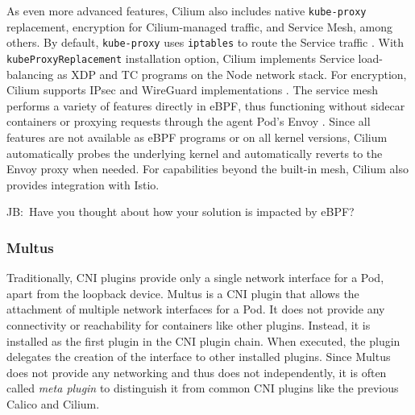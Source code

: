 \documentclass[english, 12pt, a4paper, sci, utf8, a-2b, online]{aaltothesis}
\newcommand{\mycomment}[3]{\textcolor{#1}{#2:~#3}}
\newcommand{\jb}[1]{\noindent\mycomment{aaltoRed}{JB}{#1}}
\begin{document}
As even more advanced features, Cilium also includes native \texttt{kube-proxy} replacement, encryption for Cilium-managed traffic, and Service Mesh, among others.
By default, \texttt{kube-proxy} uses \texttt{iptables} to route the Service traffic \cite{cilium-proxy-free}.
With \texttt{kubeProxyReplacement} installation option, Cilium implements Service load-balancing as XDP and TC programs on the Node network stack.
For encryption, Cilium supports IPsec and WireGuard implementations \cite{cilium-encryption}.
The service mesh performs a variety of features directly in eBPF, thus functioning without sidecar containers or proxying requests through the agent Pod's Envoy \cite{cilium-service-mesh}.
Since all features are not available as eBPF programs or on all kernel versions,  Cilium automatically probes the underlying kernel and automatically reverts to the Envoy proxy when needed.
For capabilities beyond the built-in mesh, Cilium also provides integration with Istio.

\jb{Have you thought about how your solution is impacted by eBPF?}

\subsubsection{Multus}

Traditionally, CNI plugins provide only a single network interface for a Pod, apart from the loopback device.
Multus \cite{multus-cni} is a CNI plugin that allows the attachment of multiple network interfaces for a Pod.
It does not provide any connectivity or reachability for containers like other plugins.
Instead, it is installed as the first plugin in the CNI plugin chain.
When executed, the plugin delegates the creation of the interface to other installed plugins.
Since Multus does not provide any networking and thus does not independently, it is often called \emph{meta plugin} to distinguish it from common CNI plugins like the previous Calico and Cilium.
\end{document}
